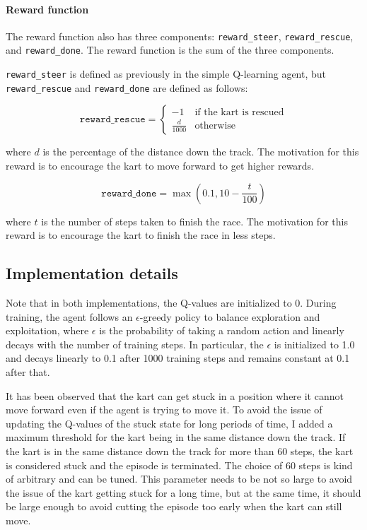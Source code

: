 \documentclass{article}
\begin{document}
\paragraph{Reward function}
The reward function also has three components: \texttt{reward\_steer}, \texttt{reward\_rescue}, and \texttt{reward\_done}. The reward function is the sum of the three components.

\texttt{reward\_steer} is defined as previously in the simple Q-learning agent, but \texttt{reward\_rescue} and \texttt{reward\_done} are defined as follows:

\begin{equation}
    \texttt{reward\_rescue} = \begin{cases}
        -1 & \text{if the kart is rescued} \\
        \frac{d}{1000} & \text{otherwise}
    \end{cases}
\end{equation}

where $d$ is the percentage of the distance down the track. The motivation for this reward is to encourage the kart to move forward to get higher rewards.

\begin{equation}
    \texttt{reward\_done} = \max(0.1, 10 - \frac{t}{100})
\end{equation}

where $t$ is the number of steps taken to finish the race. The motivation for this reward is to encourage the kart to finish the race in less steps.

\subsection{Implementation details}

Note that in both implementations, the Q-values are initialized to 0. During training, the agent follows an $\epsilon$-greedy policy to balance exploration and exploitation, where $\epsilon$ is the probability of taking a random action and linearly decays with the number of training steps. In particular, the $\epsilon$ is initialized to 1.0 and decays linearly to 0.1 after 1000 training steps and remains constant at 0.1 after that.

It has been observed that the kart can get stuck in a position where it cannot move forward even if the agent is trying to move it. To avoid the issue of updating the Q-values of the stuck state for long periods of time, I added a maximum threshold for the kart being in the same distance down the track. If the kart is in the same distance down the track for more than 60 steps, the kart is considered stuck and the episode is terminated. The choice of 60 steps is kind of arbitrary and can be tuned. This parameter needs to be not so large to avoid the issue of the kart getting stuck for a long time, but at the same time, it should be large enough to avoid cutting the episode too early when the kart can still move.
\end{document}
